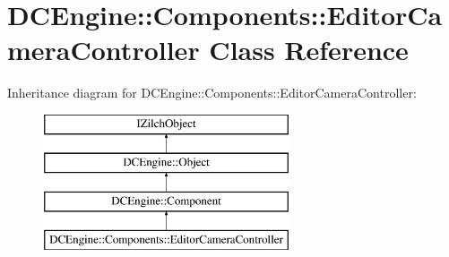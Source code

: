 \hypertarget{classDCEngine_1_1Components_1_1EditorCameraController}{\section{D\-C\-Engine\-:\-:Components\-:\-:Editor\-Camera\-Controller Class Reference}
\label{classDCEngine_1_1Components_1_1EditorCameraController}
}
Inheritance diagram for D\-C\-Engine\-:\-:Components\-:\-:Editor\-Camera\-Controller\-:\begin{figure}[H]
\begin{center}
\leavevmode
\includegraphics[height=4.000000cm]{classDCEngine_1_1Components_1_1EditorCameraController}
\end{center}
\end{figure}
